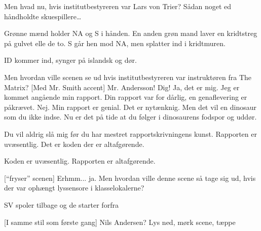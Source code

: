 \documentclass[a4paper,11pt]{article}
\begin{document}
\begin{sketch}
 Men hvad nu, hvis institutbestyreren var Lars von Trier? Sådan noget
ed håndholdte skuespillere\ldots

\scene Grønne mænd holder NA og S i hånden. En anden grøn mand laver en
kridtstreg på gulvet elle de to. S går hen mod NA, men splatter ind i kridtmuren.

\scene ID kommer ind, synger på islandsk og dør.



 Men hvordan ville scenen se ud hvis institutbestyreren var instruktøren fra The Matrix?
[Med Mr. Smith accent] Mr. Andersson!
  Dig!
 Ja, det er mig. Jeg er kommet angående min rapport.
 Din rapport var for dårlig, en genaflevering er påkrævet.
 Nej. Min rapport er genial. Det er nytænknig. Men det vil en dinosaur som du ikke indse.
Nu er det på tide at du følger i dinosaurens fodspor og uddør.

 Du vil aldrig slå mig før du har mestret rapportskrivningens kunst.
 Rapporten er uvæsentlig. Det er koden der er altafgørende.

 Koden er uvæsentlig. Rapporten er altafgørende.

[``fryser'' scenen] Erhmm... ja. Men hvordan ville denne scene så tage sig ud,
hvis der var ophængt lyssensore i klasselokalerne?

\scene SV spoler tilbage og de starter forfra

[I samme stil som første gang] Nils Andersen?
\scene Lys ned, mørk scene, tæppe

\end{sketch}
\end{document}
